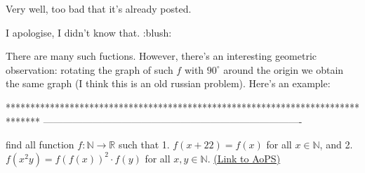 \begin{mysolution}
	Very well, too bad that it's already posted.
\end{mysolution}



\begin{mysolution}
	I apologise, I didn't know that. :blush:
\end{mysolution}



\begin{mysolution}
	There are many such fuctions. However, there's an interesting geometric observation: rotating the graph of such $f$ with $90^{\circ}$  around the origin we obtain the same graph (I think this is an old russian problem).
Here's an example:
\end{mysolution}
*******************************************************************************
-------------------------------------------------------------------------------

\begin{problem}
	find all function $f:\mathbb{N}\rightarrow \mathbb{R}$ such that
1. $f(x+22)=f(x)$ for all $x \in \mathbb N$, and
2. $f(x^2y)=f(f(x))^2 \cdot f(y)$ for all $x,y \in \mathbb N$.
	\flushright \href{https://artofproblemsolving.com/community/c6h49768}{(Link to AoPS)}
\end{problem}



